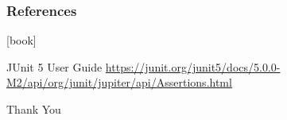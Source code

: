 \documentclass{beamer}
\begin{document}
\begin{frame}
\frametitle{References}
\begin{thebibliography}{2} %
[book]

 JUnit 5 User Guide
\bibitem{} \url{https://junit.org/junit5/docs/5.0.0-M2/api/org/junit/jupiter/api/Assertions.html}
\end{thebibliography}
\end{frame}


\begin{frame}
\Huge{\centerline{Thank You}}
\end{frame}


\end{document}
